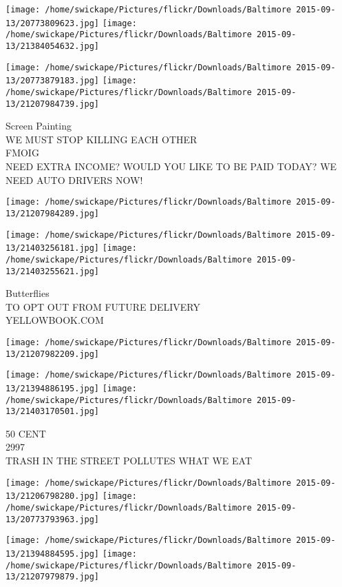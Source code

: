 \documentclass[10pt,letterpaper]{article}
\begin{document}
\texttt{[image: /home/swickape/Pictures/flickr/Downloads/Baltimore 2015-09-13/20773809623.jpg]}
\texttt{[image: /home/swickape/Pictures/flickr/Downloads/Baltimore 2015-09-13/21384054632.jpg]}

\texttt{[image: /home/swickape/Pictures/flickr/Downloads/Baltimore 2015-09-13/20773879183.jpg]}
\texttt{[image: /home/swickape/Pictures/flickr/Downloads/Baltimore 2015-09-13/21207984739.jpg]}

Screen Painting\\
WE MUST STOP KILLING EACH OTHER\\
FMOIG\\
NEED EXTRA INCOME?  WOULD YOU LIKE TO BE PAID TODAY?  WE NEED AUTO DRIVERS NOW!\\
\pagebreak

\texttt{[image: /home/swickape/Pictures/flickr/Downloads/Baltimore 2015-09-13/21207984289.jpg]}

\vspace{0.25in}
\texttt{[image: /home/swickape/Pictures/flickr/Downloads/Baltimore 2015-09-13/21403256181.jpg]}
\texttt{[image: /home/swickape/Pictures/flickr/Downloads/Baltimore 2015-09-13/21403255621.jpg]}

Butterflies\\
TO OPT OUT FROM FUTURE DELIVERY\\
YELLOWBOOK.COM\\
\pagebreak

\texttt{[image: /home/swickape/Pictures/flickr/Downloads/Baltimore 2015-09-13/21207982209.jpg]}

\vspace{0.25in}
\texttt{[image: /home/swickape/Pictures/flickr/Downloads/Baltimore 2015-09-13/21394886195.jpg]}
\texttt{[image: /home/swickape/Pictures/flickr/Downloads/Baltimore 2015-09-13/21403170501.jpg]}

50 CENT\\
2997\\
TRASH IN THE STREET POLLUTES WHAT WE EAT\\
\pagebreak

\texttt{[image: /home/swickape/Pictures/flickr/Downloads/Baltimore 2015-09-13/21206798280.jpg]}
\texttt{[image: /home/swickape/Pictures/flickr/Downloads/Baltimore 2015-09-13/20773793963.jpg]}

\texttt{[image: /home/swickape/Pictures/flickr/Downloads/Baltimore 2015-09-13/21394884595.jpg]}
\texttt{[image: /home/swickape/Pictures/flickr/Downloads/Baltimore 2015-09-13/21207979879.jpg]}
\end{document}
